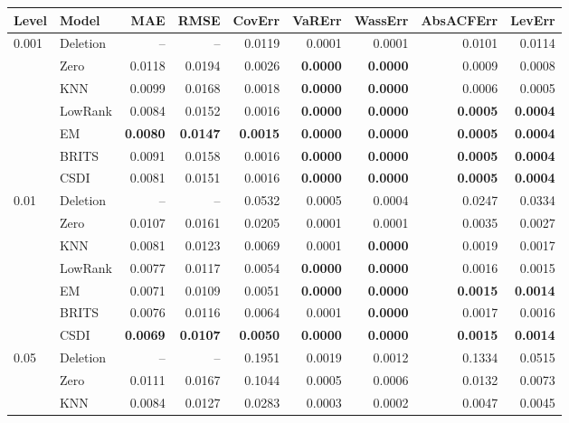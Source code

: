 {\fontsize{4.9}{5.5}\selectfont\setlength{\tabcolsep}{9pt}
\setlength{\aboverulesep}{0.25ex}\setlength{\belowrulesep}{0.4ex}
\begin{tabular}{@{}llrrrrrrr@{}}
\toprule
Level & Model & MAE & RMSE & CovErr & VaRErr & WassErr & AbsACFErr & LevErr \\
\midrule
0.001 & Deletion & -- & -- & 0.0119 & 0.0001 & 0.0001 & 0.0101 & 0.0114 \\
 & Zero & 0.0118 & 0.0194 & 0.0026 & \textbf{0.0000} & \textbf{0.0000} & 0.0009 & 0.0008 \\
 & KNN & 0.0099 & 0.0168 & 0.0018 & \textbf{0.0000} & \textbf{0.0000} & 0.0006 & 0.0005 \\
 & LowRank & 0.0084 & 0.0152 & 0.0016 & \textbf{0.0000} & \textbf{0.0000} & \textbf{0.0005} & \textbf{0.0004} \\
 & EM & \textbf{0.0080} & \textbf{0.0147} & \textbf{0.0015} & \textbf{0.0000} & \textbf{0.0000} & \textbf{0.0005} & \textbf{0.0004} \\
 & BRITS & 0.0091 & 0.0158 & 0.0016 & \textbf{0.0000} & \textbf{0.0000} & \textbf{0.0005} & \textbf{0.0004} \\
 & CSDI & 0.0081 & 0.0151 & 0.0016 & \textbf{0.0000} & \textbf{0.0000} & \textbf{0.0005} & \textbf{0.0004} \\
\midrule
0.01 & Deletion & -- & -- & 0.0532 & 0.0005 & 0.0004 & 0.0247 & 0.0334 \\
 & Zero & 0.0107 & 0.0161 & 0.0205 & 0.0001 & 0.0001 & 0.0035 & 0.0027 \\
 & KNN & 0.0081 & 0.0123 & 0.0069 & 0.0001 & \textbf{0.0000} & 0.0019 & 0.0017 \\
 & LowRank & 0.0077 & 0.0117 & 0.0054 & \textbf{0.0000} & \textbf{0.0000} & 0.0016 & 0.0015 \\
 & EM & 0.0071 & 0.0109 & 0.0051 & \textbf{0.0000} & \textbf{0.0000} & \textbf{0.0015} & \textbf{0.0014} \\
 & BRITS & 0.0076 & 0.0116 & 0.0064 & 0.0001 & \textbf{0.0000} & 0.0017 & 0.0016 \\
 & CSDI & \textbf{0.0069} & \textbf{0.0107} & \textbf{0.0050} & \textbf{0.0000} & \textbf{0.0000} & \textbf{0.0015} & \textbf{0.0014} \\
\midrule
0.05 & Deletion & -- & -- & 0.1951 & 0.0019 & 0.0012 & 0.1334 & 0.0515 \\
 & Zero & 0.0111 & 0.0167 & 0.1044 & 0.0005 & 0.0006 & 0.0132 & 0.0073 \\
 & KNN & 0.0084 & 0.0127 & 0.0283 & 0.0003 & 0.0002 & 0.0047 & 0.0045 \\

\end{tabular}}

